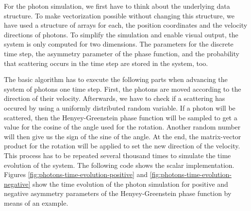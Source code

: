 \documentclass{stdlocal}
\begin{document}
    For the photon simulation, we first have to think about the underlying data structure.
    To make vectorization possible without changing this structure, we have used a structure of arrays for each, the position coordinates and the velocity directions of photons.
    To simplify the simulation and enable visual output, the system is only computed for two dimensions.
    The parameters for the discrete time step, the asymmetry parameter of the phase function, and the probability that scattering occurs in the time step are stored in the system, too.

    The basic algorithm has to execute the following parts when advancing the system of photons one time step.
    First, the photons are moved according to the direction of their velocity.
    Afterwards, we have to check if a scattering has occured by using a uniformly distributed random variable.
    If a photon will be scattered, then the Henyey-Greenstein phase function will be sampled to get a value for the cosine of the angle used for the rotation.
    Another random number will then give us the sign of the sine of the angle.
    At the end, the matrix-vector product for the rotation will be applied to set the new direction of the velocity.
    This process has to be repeated several thousand times to simulate the time evolution of the system.
    The following code shows the scalar implementation.
    Figures \ref{fig:photons-time-evolution-positive} and \ref{fig:photons-time-evolution-negative} show the time evolution of the photon simulation for positive and negative asymmetry parameters of the Henyey-Greenstein phase function by means of an example.
\end{document}
